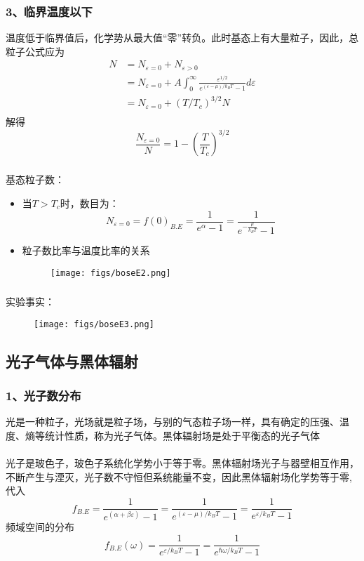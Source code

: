 \begin{frame}
  \frametitle{ 3、临界温度以下 }
  温度低于临界值后，化学势从最大值“零”转负。此时基态上有大量粒子，因此，总粒子公式应为
  \[ \begin{aligned}
    N &= N_{\varepsilon =0} + N_{\varepsilon > 0} \\ 
    &=N_{\varepsilon =0} + A \int_0^\infty \frac{\varepsilon^{1/2}}{e^{(\varepsilon - \mu) /k_B T }-1} d \varepsilon \\
    &=  N_{\varepsilon =0} + \left(T/T_c\right)^{3/2} N \\
  \end{aligned}\]
解得 
\[  \frac{N_{\varepsilon =0}}{N} =  1- \left(\frac{T}{T_c}\right)^{3/2} \]
\end{frame} 

\begin{frame}
  \frametitle{}
\alert{基态粒子数：} 
\begin{itemize}
  \item 当$T>T_c$时，数目为：$$N_{\varepsilon =0} = f(0)_{B.E} = \frac{1}{e^{\alpha}-1} = \frac{1}{e^{-\frac{\mu}{k_B T}}-1}$$ 
  \item 粒子数比率与温度比率的关系
  \begin{figure}[htbp]
    \centering
    \texttt{[image: figs/boseE2.png]}
  \end{figure}
\end{itemize}
\end{frame} 

\begin{frame}
  \frametitle{}
实验事实：
\begin{figure}[htbp]
  \centering
  \texttt{[image: figs/boseE3.png]}
\end{figure}
\end{frame} 

\subsection{光子气体与黑体辐射}
\begin{frame}
  \frametitle{ 1、光子数分布}
    光是一种粒子，光场就是粒子场，与别的气态粒子场一样，具有确定的压强、温度、熵等统计性质，称为光子气体。黑体辐射场是处于平衡态的光子气体 \\
    ~~\\ 
    光子是玻色子，玻色子系统化学势小于等于零。黑体辐射场光子与器壁相互作用，不断产生与湮灭，光子数不守恒但系统能量不变，因此黑体辐射场化学势等于零, 代入\\
    \[f_{B.E} =  \frac{1}{e^{(\alpha +\beta \varepsilon)}-1} = \frac{1}{e^{(\varepsilon - \mu)/k_B T}-1} = \frac{1}{e^{\varepsilon /k_B T}-1} \]
    频域空间的分布
    \[f_{B.E}(\omega) =  \frac{1}{e^{\varepsilon /k_B T}-1} = \frac{1}{e^{\hbar \omega /k_B T}-1} \] 
\end{frame} 

